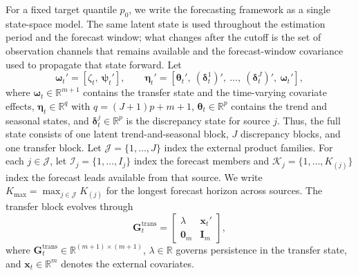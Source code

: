\documentclass[APA,STIX1COL]{WileyNJD-v2}
\begin{document}
For a fixed target quantile \(p_0\), we write the forecasting framework as a single state-space model. The same latent state is used throughout the estimation period and the forecast window; what changes after the cutoff is the set of observation channels that remains available and the forecast-window covariance used to propagate that state forward. Let
\[
\boldsymbol{\omega}_t' = [\zeta_t,\ \boldsymbol{\psi}_t'], \qquad
\boldsymbol{\eta}_t' = [\boldsymbol{\theta}_t',\ (\boldsymbol{\delta}_t^1)',\ \ldots,\ (\boldsymbol{\delta}_t^J)',\ \boldsymbol{\omega}_t'],
\]
where \(\boldsymbol{\omega}_t \in \mathbb{R}^{m+1}\) contains the transfer state and the time-varying covariate effects, \(\boldsymbol{\eta}_t \in \mathbb{R}^{q}\) with \(q = (J+1)p + m + 1\), \(\boldsymbol{\theta}_t \in \mathbb{R}^p\) contains the trend and seasonal states, and \(\boldsymbol{\delta}_t^j \in \mathbb{R}^p\) is the discrepancy state for source \(j\). Thus, the full state consists of one latent trend-and-seasonal block, \(J\) discrepancy blocks, and one transfer block. Let \(\mathcal{J}=\{1,\ldots,J\}\) index the external product families. For each \(j\in\mathcal{J}\), let \(\mathcal{I}_j=\{1,\ldots,I_j\}\) index the forecast members and \(\mathcal{K}_j=\{1,\ldots,K_{(j)}\}\) index the forecast leads available from that source. We write \(K_{\max}=\max_{j\in\mathcal{J}} K_{(j)}\) for the longest forecast horizon across sources. The transfer block evolves through
\[
\mathbf{G}^{\text{trans}}_t =
\begin{bmatrix}
\lambda & \mathbf{x}_t' \\
\mathbf{0}_m & \mathbf{I}_m
\end{bmatrix},
\]
where \(\mathbf{G}^{\text{trans}}_t \in \mathbb{R}^{(m+1)\times(m+1)}\), \(\lambda \in \mathbb{R}\) governs persistence in the transfer state, and \(\mathbf{x}_t \in \mathbb{R}^{m}\) denotes the external covariates.
\end{document}
